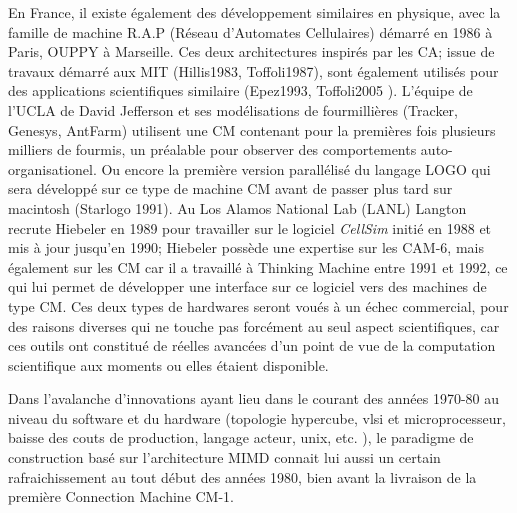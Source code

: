 En France, il existe également des développement similaires en physique, avec la famille de machine R.A.P (Réseau d’Automates Cellulaires) démarré en 1986 à Paris, OUPPY à Marseille. Ces deux architectures inspirés par les CA; issue de travaux démarré aux MIT (Hillis1983, Toffoli1987), sont également utilisés pour des applications scientifiques similaire (Epez1993, Toffoli2005 ). L’équipe de l’UCLA de David Jefferson et ses modélisations de fourmillières (Tracker, Genesys, AntFarm) utilisent une CM contenant pour la premières fois plusieurs milliers de fourmis, un préalable pour observer des comportements auto-organisationel. Ou encore la première version parallélisé du langage LOGO qui sera développé sur ce type de machine CM avant de passer plus tard sur macintosh (Starlogo 1991). Au Los Alamos National Lab (LANL) Langton recrute Hiebeler en 1989 pour travailler sur le logiciel \textit{CellSim} initié en 1988 et mis à jour jusqu’en 1990; Hiebeler possède une expertise sur les CAM-6, mais également sur les CM car il a travaillé à Thinking Machine entre 1991 et 1992, ce qui lui permet de développer une interface sur ce logiciel vers des machines de type CM. Ces deux types de hardwares seront voués à un échec commercial, pour des raisons diverses qui ne touche pas forcément au seul aspect scientifiques, car ces outils ont constitué de réelles avancées d’un point de vue de la computation scientifique aux moments ou elles étaient disponible.

Dans l'avalanche d'innovations ayant lieu dans le courant des années 1970-80 au niveau du software et du hardware (topologie hypercube, vlsi et microprocesseur, baisse des couts de production, langage acteur, unix, etc. ), le paradigme de construction basé sur l'architecture MIMD connait lui aussi un certain rafraichissement au tout début des années 1980, bien avant la livraison de la première Connection Machine CM-1.

